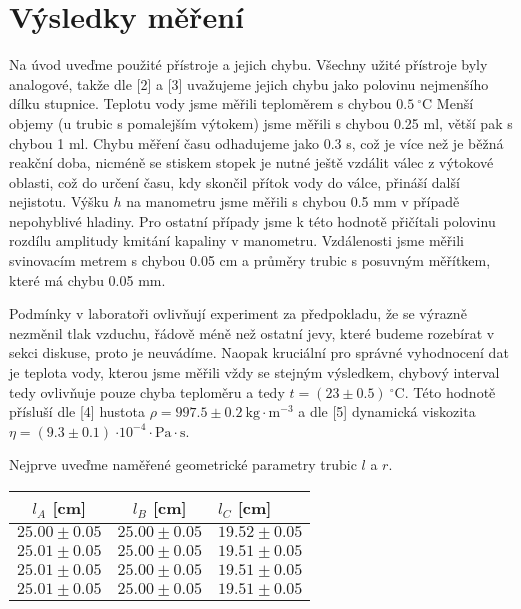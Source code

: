 \documentclass[a4paper]{article}
\begin{document}
\section*{Výsledky měření}
\par Na úvod uveďme použité přístroje a jejich chybu. Všechny užité přístroje byly analogové, takže dle [2] a [3] uvažujeme jejich chybu jako polovinu nejmenšího dílku stupnice. Teplotu vody jsme měřili teploměrem s chybou $0.5\:^{\circ}\mathrm{C}$ Menší objemy (u trubic s pomalejším výtokem) jsme měřili s chybou 0.25 ml, větší pak s chybou 1 ml. Chybu měření času odhadujeme jako 0.3 s, což je více než je běžná reakční doba, nicméně se stiskem stopek je nutné ještě vzdálit válec z výtokové oblasti, což do určení času, kdy skončil přítok vody do válce, přináší další nejistotu. Výšku $h$ na manometru jsme měřili s chybou 0.5 mm v případě nepohyblivé hladiny. Pro ostatní případy jsme k této hodnotě přičítali polovinu rozdílu amplitudy kmitání kapaliny v manometru. Vzdálenosti jsme měřili svinovacím metrem s chybou 0.05 cm a průměry trubic s posuvným měřítkem, které má chybu 0.05 mm.
\par Podmínky v laboratoři ovlivňují experiment za předpokladu, že se výrazně nezměnil tlak vzduchu, řádově méně než ostatní jevy, které budeme rozebírat v sekci diskuse, proto je neuvádíme. Naopak kruciální pro správné vyhodnocení dat je teplota vody, kterou jsme měřili vždy se stejným výsledkem, chybový interval tedy ovlivňuje pouze chyba teploměru a tedy $t = (23\pm0.5)\:^{\circ}\mathrm{C}$. Této hodnotě přísluší dle [4] hustota $\rho = 997.5\pm0.2 \: \mathrm{kg \cdot m^{-3}}$ a dle [5] dynamická viskozita $\eta = (9.3\pm0.1)\: \mathrm{\cdot 10^{-4} \cdot Pa \cdot s}$.
\par Nejprve uveďme naměřené geometrické parametry trubic $l$ a $r$.
\begin{center}
    \label{tab:title}
    \begin{tabular}{ | c | c |  p{3cm} |} \hline
    $l_{A}$ [cm] & $l_{B}$ [cm] & $l_{C}$ [cm]   \\ \hline
    $25.00\pm0.05$ & $25.00\pm0.05$ & $19.52\pm0.05$ \\ \hline
    $25.01\pm0.05$ & $25.00\pm0.05$ & $19.51\pm0.05$ \\ \hline
    $25.01\pm0.05$ & $25.00\pm0.05$ & $19.51\pm0.05$ \\ \hline
    $25.01\pm0.05$ & $25.00\pm0.05$ & $19.51\pm0.05$  \\ \hline
    \end{tabular}
\end{center}
\end{document}
